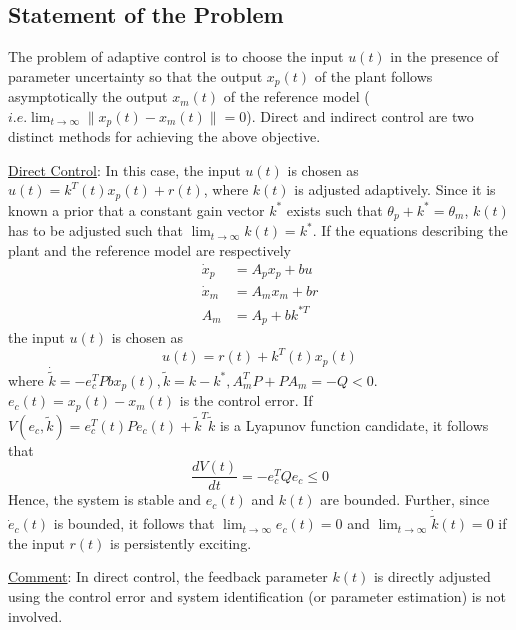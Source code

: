 \documentclass[conference]{IEEEtran}
\begin{document}
\subsection{Statement of the Problem}
The problem of adaptive control is to choose the input $u(t)$ in the presence of parameter uncertainty so that the output $x_{p}(t)$ of the plant follows asymptotically the output $x_{m}(t)$ of the reference model ($i.e. \lim_{t\to \infty}\|x_{p}(t)-x_{m}(t)\|=0$). Direct and indirect control are two distinct methods for achieving the above objective.

{\large \underline{Direct Control}}: In this case, the input $u(t)$ is chosen as $u(t)=k^{T}(t)x_{p}(t)+r(t)$, where $k(t)$ is adjusted adaptively. Since it is known a prior that a constant gain vector $k^{*}$ exists such that $\theta_{p}+k^{*}=\theta_{m}$, $k(t)$ has to be adjusted such that $\lim_{t\to\infty}k(t)=k^{*}$. If the equations describing the plant and the reference model are respectively
\begin{equation*}
\begin{split}
\dot{x}_{p}&=A_{p}x_{p}+bu\\
\dot{x}_{m}&=A_{m}x_{m}+br\\
A_{m}&=A_{p}+bk^{*T}
\end{split}
\end{equation*}
the input $u(t)$ is chosen as
\begin{equation*}
u(t)=r(t)+k^{T}(t)x_{p}(t)
\end{equation*}
where $\dot{\tilde{k}}=-e_{c}^{T}Pbx_{p}(t), \tilde{k}=k-k^{*}, A_{m}^{T}P+PA_{m}=-Q<0$. $e_{c}(t)=x_{p}(t)-x_{m}(t)$ is the control error. If $V(e_{c},\tilde{k})=e_{c}^{T}(t)Pe_{c}(t)+\tilde{k}^{T}\tilde{k}$ is a Lyapunov function candidate, it follows that
\begin{equation}
\frac{dV(t)}{dt}=-e_{c}^{T}Qe_{c}\leq 0
\end{equation}
Hence, the system is stable and $e_{c}(t)$ and $k(t)$ are bounded. Further, since $\dot{e}_{c}(t)$ is bounded, it follows that $\lim_{t\to\infty}e_{c}(t)=0$ and $\lim_{t\to\infty}\dot{\tilde{k}}(t)=0$ if the input $r(t)$ is persistently exciting.

\underline{Comment}: In direct control, the feedback parameter $k(t)$ is directly adjusted using the control error and system identification (or parameter estimation) is not involved.
\end{document}
